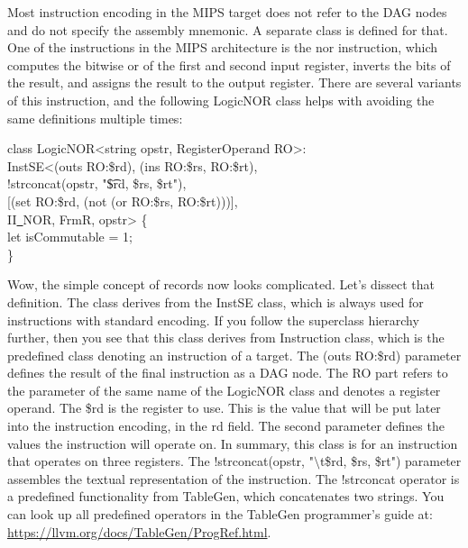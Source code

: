 Most instruction encoding in the MIPS target does not refer to the DAG nodes and do not specify the assembly mnemonic. A separate class is defined for that. One of the instructions in the MIPS architecture is the nor instruction, which computes the bitwise or of the first and second input register, inverts the bits of the result, and assigns the result to the output register. There are several variants of this instruction, and the following LogicNOR class helps with avoiding the same definitions multiple times:\par

\begin{tcolorbox}[colback=white,colframe=black]
class LogicNOR<string opstr, RegisterOperand RO>: \\
\hspace*{0.5cm}InstSE<(outs RO:\$rd), (ins RO:\$rs, RO:\$rt), \\
\hspace*{3cm}!strconcat(opstr, "\t\$rd, \$rs, \$rt"), \\
\hspace*{3cm}[(set RO:\$rd, (not (or RO:\$rs, RO:\$rt)))], \\
\hspace*{3cm}II\underline{~}NOR, FrmR, opstr> \{ \\
\hspace*{0.5cm}let isCommutable = 1; \\
\}
\end{tcolorbox}

Wow, the simple concept of records now looks complicated. Let's dissect that definition. The class derives from the InstSE class, which is always used for instructions with standard encoding. If you follow the superclass hierarchy further, then you see that this class derives from Instruction class, which is the predefined class denoting an instruction of a target. The (outs RO:\$rd) parameter defines the result of the final instruction as a DAG node. The RO part refers to the parameter of the same name of the LogicNOR class and denotes a register operand. The \$rd is the register to use. This is the value that will be put later into the instruction encoding, in the rd field. The second parameter defines the values the instruction will operate on. In summary, this class is for an instruction that operates on three registers. The !strconcat(opstr, "$\setminus$t\$rd, \$rs, \$rt") parameter assembles the textual representation of the instruction. The !strconcat operator is a predefined functionality from TableGen, which concatenates two strings. You can look up all predefined operators in the TableGen programmer's guide at: \url{https://llvm.org/docs/TableGen/ProgRef.html}.\par

